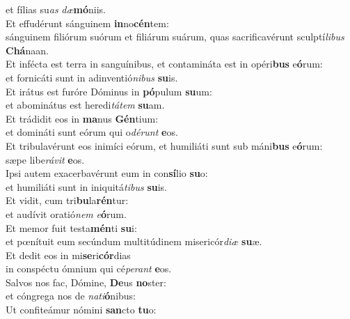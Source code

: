 \oddverse et fílias su\textit{as} \textit{dæ}\textbf{mó}niis.\\
\evenverse Et effudérunt sánguinem \textbf{in}no\textbf{cén}tem:~\*\\
\evenverse sánguinem filiórum suórum et filiárum suárum, quas sacrificavérunt sculptí\textit{li}\textit{bus} \textbf{Chá}naan.\\
\oddverse Et infécta est terra in sanguínibus, et contamináta est in opéri\textbf{bus} e\textbf{ó}rum:~\*\\
\oddverse et fornicáti sunt in adinventió\textit{ni}\textit{bus} \textbf{su}is.\\
\evenverse Et irátus est furóre Dóminus in \textbf{pó}pulum \textbf{su}um:~\*\\
\evenverse et abominátus est heredi\textit{tá}\textit{tem} \textbf{su}am.\\
\oddverse Et trádidit eos in \textbf{ma}nus \textbf{Gén}tium:~\*\\
\oddverse et domináti sunt eórum qui o\textit{dé}\textit{runt} \textbf{e}os.\\
\evenverse Et tribulavérunt eos inimíci eórum, et humiliáti sunt sub máni\textbf{bus} e\textbf{ó}rum:~\*\\
\evenverse sæpe libe\textit{rá}\textit{vit} \textbf{e}os.\\
\oddverse Ipsi autem exacerbavérunt eum in con\textbf{sí}lio \textbf{su}o:~\*\\
\oddverse et humiliáti sunt in iniquitá\textit{ti}\textit{bus} \textbf{su}is.\\
\evenverse Et vidit, cum tri\textbf{bu}la\textbf{rén}tur:~\*\\
\evenverse et audívit oratió\textit{nem} \textit{e}\textbf{ó}rum.\\
\oddverse Et memor fuit testa\textbf{mén}ti \textbf{su}i:~\*\\
\oddverse et pœnítuit eum secúndum multitúdinem misericór\textit{di}\textit{æ} \textbf{su}æ.\\
\evenverse Et dedit eos in mi\textbf{se}ri\textbf{cór}dias~\*\\
\evenverse in conspéctu ómnium qui cé\textit{pe}\textit{rant} \textbf{e}os.\\
\oddverse Salvos nos fac, Dómine, \textbf{De}us \textbf{no}ster:~\*\\
\oddverse et cóngrega nos de \textit{na}\textit{ti}\textbf{ó}nibus:\\
\evenverse Ut confiteámur nómini \textbf{san}cto \textbf{tu}o:~\*\\
